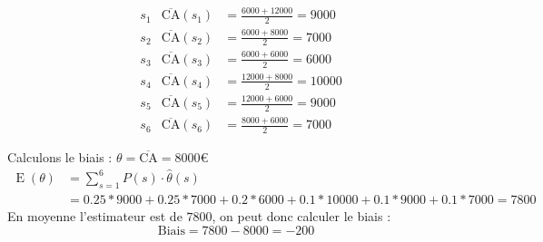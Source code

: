 \documentclass[a4paper]{article}
\DeclareMathOperator{\E}{E}
\begin{document}
\begin{align*}
    &s_1 &\overline{\text{CA}}(s_1) &= \frac{6000 + 12000}{2} = 9000 \\
    &s_2 &\overline{\text{CA}}(s_2) &= \frac{6000 + 8000}{2} = 7000 \\
    &s_3 &\overline{\text{CA}}(s_3) &= \frac{6000 + 6000}{2} = 6000 \\
    &s_4 &\overline{\text{CA}}(s_4) &= \frac{12000 + 8000}{2} = 10000 \\
    &s_5 &\overline{\text{CA}}(s_5) &= \frac{12000 + 6000}{2} = 9000 \\
    &s_6 &\overline{\text{CA}}(s_6) &= \frac{8000 + 6000}{2} = 7000
\end{align*}

Calculons le biais : $\theta = \overline{\text{CA}} = 8000€$
\begin{equation*}
\begin{split}
    \E\left( \theta \right) &= \sum_{s = 1}^{6} P(s) \cdot \hat{\theta}(s) \\
    &= 0.25 * 9000 + 0.25 * 7000 + 0.2 * 6000 + 0.1 * 10000 + 0.1 * 9000 + 0.1 * 7000 = 7800
\end{split}
\end{equation*}
En moyenne l'estimateur est de $7800$, on peut donc calculer le biais : 
\begin{equation*}
   \text{Biais} = 7800 - 8000 = -200 
\end{equation*}
\end{document}
